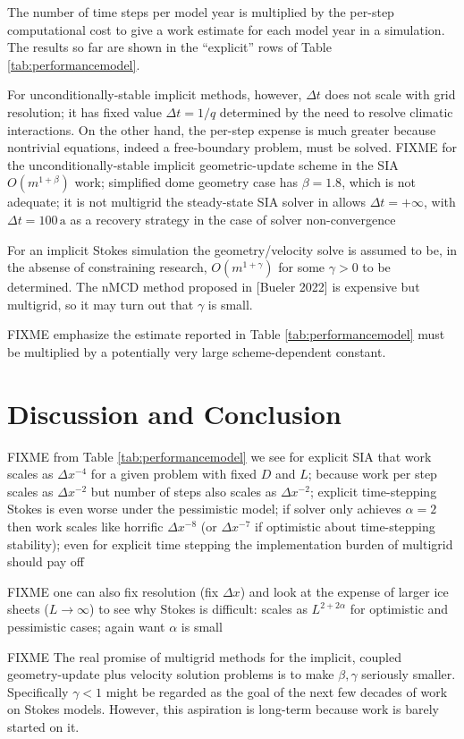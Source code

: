 \documentclass[twocolumn,letterpaper]{igs}
\begin{document}
The number of time steps per model year is multiplied by the per-step computational cost to give a work estimate for each model year in a simulation.  The results so far are shown in the ``explicit'' rows of Table \ref{tab:performancemodel}.

For unconditionally-stable implicit methods, however, $\Delta t$ does not scale with grid resolution; it has fixed value $\Delta t = 1/q$ determined by the need to resolve climatic interactions.  On the other hand, the per-step expense is much greater because nontrivial equations, indeed a free-boundary problem, must be solved.  FIXME for the unconditionally-stable implicit geometric-update scheme in the SIA $O(m^{1+\beta})$ work; \cite{Bueler2016} simplified dome geometry case has $\beta=1.8$, which is not adequate; it is not multigrid
the steady-state SIA solver in \cite{Bueler2016} allows $\Delta t=+\infty$, with $\Delta t = 100 \,\text{a}$ as a recovery strategy in the case of solver non-convergence

For an implicit Stokes simulation the geometry/velocity solve is assumed to be, in the absense of constraining research, $O(m^{1+\gamma})$ for some $\gamma>0$ to be determined.  The nMCD method proposed in [Bueler 2022] is expensive but multigrid, so it may turn out that $\gamma$ is small.

FIXME emphasize the estimate reported in Table \ref{tab:performancemodel} must be multiplied by a potentially very large scheme-dependent constant.


\section{Discussion and Conclusion}

FIXME from Table \ref{tab:performancemodel} we see for explicit SIA that work scales as $\Delta x^{-4}$ for a given problem with fixed $D$ and $L$; because work per step scales as $\Delta x^{-2}$ but number of steps also scales as $\Delta x^{-2}$; explicit time-stepping Stokes is even worse under the pessimistic model; if solver only achieves $\alpha=2$ then work scales like horrific $\Delta x^{-8}$ (or $\Delta x^{-7}$ if optimistic about time-stepping stability); even for explicit time stepping the implementation burden of multigrid should pay off

FIXME one can also fix resolution (fix $\Delta x$) and look at the expense of larger ice sheets ($L\to \infty$) to see why Stokes is difficult: scales as $L^{2+2\alpha}$ for optimistic and pessimistic cases; again want $\alpha$ is small

FIXME The real promise of multigrid methods for the implicit, coupled geometry-update plus velocity solution problems is to make $\beta,\gamma$ seriously smaller.  Specifically $\gamma < 1$ might be regarded as the goal of the next few decades of work on Stokes models.  However, this aspiration is long-term because work is barely started on it.



\end{document}
